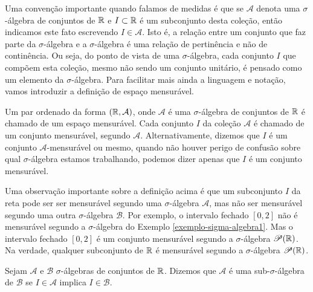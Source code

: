         Uma convenção importante quando falamos de medidas é que se 
        $\mathcal{A}$ denota uma $\sigma$-álgebra de conjuntos de 
        $\mathbb{R}$ e $I\subset \mathbb{R}$ é um subconjunto desta coleção, 
        então indicamos este fato escrevendo $I\in \mathcal{A}$. 
        Isto é, a relação entre um conjunto que faz parte da $\sigma$-álgebra
        e a $\sigma$-álgebra é uma relação de pertinência e não de continência. 
        Ou seja, do ponto de vista de uma $\sigma$-álgebra, 
        cada conjunto $I$ que compõem esta coleção, 
        mesmo não sendo um conjunto unitário, 
        é pensado como um elemento da $\sigma$-álgebra. 
        Para facilitar mais ainda a linguagem e notação, vamos introduzir a 
        definição de espaço mensurável.
        \begin{definicao}
            Um par ordenado da forma $(\mathbb{R},\mathcal{A})$, onde 
            $\mathcal{A}$ é uma $\sigma$-álgebra de conjuntos de $\mathbb{R}$ é chamado de 
            um espaço mensurável. 
            Cada conjunto $I$ da coleção $\mathcal{A}$
            é chamado de um conjunto mensurável, segundo $\mathcal{A}$. 
            Alternativamente, dizemos que $I$ é um conjunto 
            $\mathcal{A}$-mensurável ou mesmo, quando não houver 
            perigo de confusão sobre qual $\sigma$-álgebra estamos 
            trabalhando, podemos dizer apenas que $I$ é um conjunto mensurável.
        \end{definicao}
        Uma observação importante sobre a definição acima é que um 
        subconjunto $I$ da reta pode ser ser mensurável 
        segundo uma $\sigma$-álgebra $\mathcal{A}$, mas não ser mensurável segundo 
        uma outra $\sigma$-álgebra $\mathcal{B}$. Por exemplo, 
        o intervalo fechado $[0,2]$ não é mensurável 
        segundo a $\sigma$-álgebra do Exemplo \ref{exemplo-sigma-algebra1}.
        Mas o intervalo fechado $[0,2]$ é um conjunto mensurável 
        segundo a $\sigma$-álgebra $\mathscr{P}(\mathbb{R})$. Na verdade,
        qualquer subconjunto de $\mathbb{R}$ é mensurável segundo 
        a $\sigma$-álgebra $\mathscr{P}(\mathbb{R})$. 
        
        \medskip 
        
        Sejam $\mathcal{A}$ e $\mathcal{B}$ $\sigma$-álgebras de conjuntos de $\mathbb{R}$.
        Dizemos que $\mathcal{A}$ é uma sub-$\sigma$-álgebra de $\mathcal{B}$
        se $I\in\mathcal{A}$ implica $I\in\mathcal{B}$.
        
